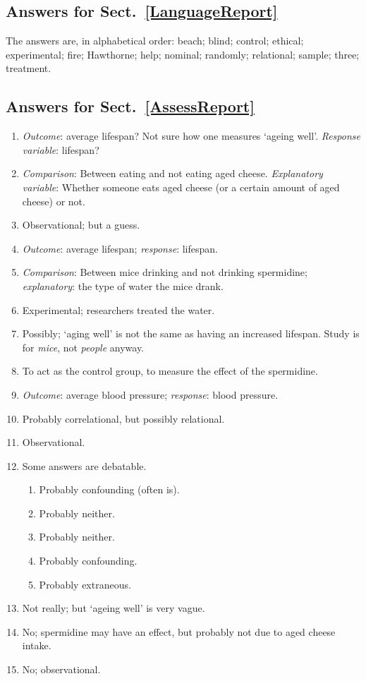 \documentclass[
  11pt,
  a4paper,
  krantz2]{krantz}
\providecommand{\tightlist}{%
  \setlength{\itemsep}{0pt}\setlength{\parskip}{0pt}}
\begin{document}
\begin{footnotesize}
\subsection*{Answers for Sect.~\ref{LanguageReport}}\label{answers-for-sect.-reflanguagereport}

The answers are, in alphabetical order:
beach; blind; control; ethical; experimental; fire; Hawthorne; help; nominal; randomly; relational; sample; three; treatment.

\subsection*{Answers for Sect.~\ref{AssessReport}}\label{answers-for-sect.-refassessreport}

\begin{enumerate}
\def\labelenumi{\arabic{enumi}.}
\tightlist
\item
  \emph{Outcome}: average lifespan? Not sure how one measures `ageing well'. \tightlist
  \emph{Response variable}: lifespan?
\item
  \emph{Comparison}: Between eating and not eating aged cheese.
  \emph{Explanatory variable}: Whether someone eats aged cheese (or a certain amount of aged cheese) or not.
\item
  Observational; but a guess.
\item
  \emph{Outcome}: average lifespan; \emph{response}: lifespan.
\item
  \emph{Comparison}: Between mice drinking and not drinking spermidine; \emph{explanatory}: the type of water the mice drank.
\item
  Experimental; researchers treated the water.
\item
  Possibly; `aging well' is not the same as having an increased lifespan.
  Study is for \emph{mice}, not \emph{people} anyway.
\item
  To act as the control group, to measure the effect of the spermidine.
\item
  \emph{Outcome}: average blood pressure; \emph{response}: blood pressure.
\item
  Probably correlational, but possibly relational.
\item
  Observational.
\item
  Some answers are debatable.

  \begin{enumerate}
  \def\labelenumii{\alph{enumii}.}
  \tightlist
  \item
    Probably confounding (often is).
  \item
    Probably neither.
  \item
    Probably neither.
  \item
    Probably confounding.
  \item
    Probably extraneous.
  \end{enumerate}
\item
  Not really; but `ageing well' is very vague.
\item
  No; spermidine may have an effect, but probably not due to aged cheese intake.
\item
  No; observational.
\end{enumerate}


\end{footnotesize}
\end{document}
